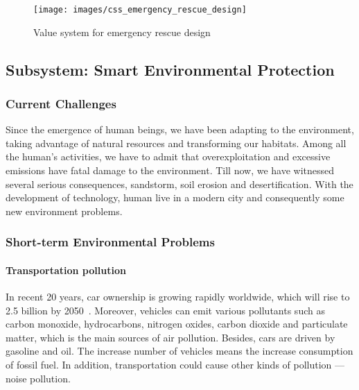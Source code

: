 \documentclass[letterpaper, twocolumn, 10pt, conference]{IEEEtran}
\begin{document}
\begin{figure}[h!]
        \centering
        \texttt{[image: images/css\_emergency\_rescue\_design]}
        \caption{Value system for emergency rescue design}
        \label{fig:css:emergency_rescue_design}
\end{figure}





\subsection{Subsystem: Smart Environmental Protection}
\label{ssec:zzj:smart_environment}

\subsubsection{Current Challenges}
\label{sssec:zzj:smart_environment:challenges}

Since the emergence of human beings, we have been adapting to the environment, taking advantage of natural resources and transforming our habitats. Among all the human's activities, we have to admit that overexploitation and excessive emissions have fatal damage to the environment. Till now, we have witnessed several serious consequences, sandstorm, soil erosion and desertification. With the development of technology, human live in a modern city and consequently some new environment problems. 

\subsubsection*{Short-term Environmental Problems}


\paragraph{Transportation pollution}

In recent 20 years, car ownership is growing rapidly worldwide, which will rise to 2.5 billion by 2050~\cite{car-population2011}. Moreover, vehicles can emit various pollutants such as carbon monoxide, hydrocarbons, nitrogen oxides, carbon dioxide and particulate matter, which is the main sources of air pollution. Besides, cars are driven by gasoline and oil. The increase number of vehicles means the increase consumption of fossil fuel. In addition, transportation could cause other kinds of pollution --- noise pollution. 
\end{document}
